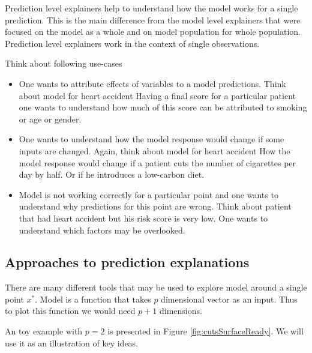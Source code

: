\documentclass[]{krantz}
\providecommand{\tightlist}{%
  \setlength{\itemsep}{0pt}\setlength{\parskip}{0pt}}
\theoremstyle{definition}
\theoremstyle{definition}
\theoremstyle{definition}
\theoremstyle{remark}
\begin{document}
Prediction level explainers help to understand how the model works for a
single prediction. This is the main difference from the model level
explainers that were focused on the model as a whole and on model
population for whole population. Prediction level explainers work in the
context of single observations.

Think about following use-cases

\begin{itemize}
\tightlist
\item
  One wants to attribute effects of variables to a model predictions.
  Think about model for heart accident Having a final score for a
  particular patient one wants to understand how much of this score can
  be attributed to smoking or age or gender.
\item
  One wants to understand how the model response would change if some
  inputs are changed. Again, think about model for heart accident How
  the model response would change if a patient cuts the number of
  cigarettes per day by half. Or if he introduces a low-carbon diet.
\item
  Model is not working correctly for a particular point and one wants to
  understand why predictions for this point are wrong. Think about
  patient that had heart accident but his risk score is very low. One
  wants to understand which factors may be overlooked.
\end{itemize}

\hypertarget{approaches-to-prediction-explanations}{%
\subsection{Approaches to prediction
explanations}\label{approaches-to-prediction-explanations}}

There are many different tools that may be used to explore model around
a single point \(x^*\). Model is a function that takes \(p\) dimensional
vector as an input. Thus to plot this function we would need \(p+1\)
dimensions.

An toy example with \(p=2\) is presented in Figure
\ref{fig:cutsSurfaceReady}. We will use it as an illustration of key
ideas.
\end{document}
